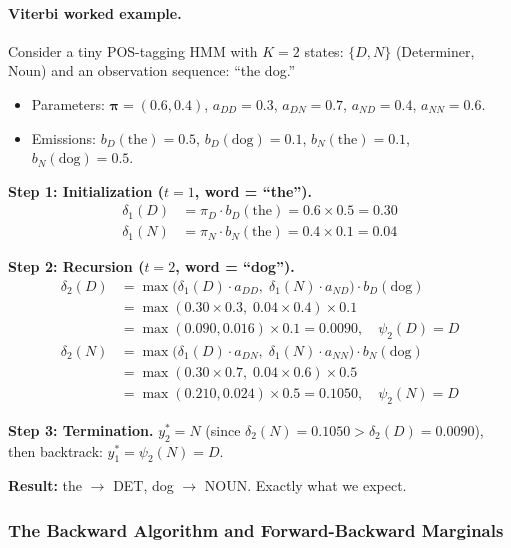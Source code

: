 \paragraph{Viterbi worked example.}
Consider a tiny POS-tagging HMM with $K = 2$ states: $\{D, N\}$
(Determiner, Noun) and an observation sequence: ``the dog.''

\begin{itemize}
    \item Parameters: $\bm{\pi} = (0.6, 0.4)$, \;
          $a_{DD} = 0.3$, $a_{DN} = 0.7$, $a_{ND} = 0.4$, $a_{NN} = 0.6$.
    \item Emissions: $b_D(\text{the}) = 0.5$, $b_D(\text{dog}) = 0.1$,
          $b_N(\text{the}) = 0.1$, $b_N(\text{dog}) = 0.5$.
\end{itemize}

\textbf{Step 1: Initialization ($t=1$, word = ``the'').}
\begin{align*}
\delta_1(D) &= \pi_D \cdot b_D(\text{the}) = 0.6 \times 0.5 = 0.30 \\
\delta_1(N) &= \pi_N \cdot b_N(\text{the}) = 0.4 \times 0.1 = 0.04
\end{align*}

\textbf{Step 2: Recursion ($t=2$, word = ``dog'').}
\begin{align*}
\delta_2(D) &= \max\bigl(\delta_1(D) \cdot a_{DD},\; \delta_1(N) \cdot a_{ND}\bigr) \cdot b_D(\text{dog}) \\
            &= \max(0.30 \times 0.3,\; 0.04 \times 0.4) \times 0.1 \\
            &= \max(0.090, 0.016) \times 0.1 = 0.0090, \quad \psi_2(D) = D \\[4pt]
\delta_2(N) &= \max\bigl(\delta_1(D) \cdot a_{DN},\; \delta_1(N) \cdot a_{NN}\bigr) \cdot b_N(\text{dog}) \\
            &= \max(0.30 \times 0.7,\; 0.04 \times 0.6) \times 0.5 \\
            &= \max(0.210, 0.024) \times 0.5 = 0.1050, \quad \psi_2(N) = D
\end{align*}

\textbf{Step 3: Termination.}
$y_2^* = N$ (since $\delta_2(N) = 0.1050 > \delta_2(D) = 0.0090$),
then backtrack: $y_1^* = \psi_2(N) = D$.

\textbf{Result:} the $\to$ DET, dog $\to$ NOUN.  Exactly what we expect.

\subsubsection{The Backward Algorithm and Forward-Backward Marginals}
\label{sec:backward}

